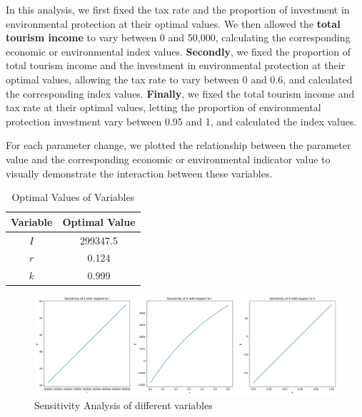 \documentclass[UTF8]{mcmthesis}
\begin{document}
            In this analysis, we first fixed the tax rate and the {proportion of investment in environmental protection} at their optimal values. We then allowed the \textbf{total tourism income} to vary between 0 and 50,000, calculating the corresponding economic or environmental index values. \textbf{Secondly}, we fixed the {proportion of total tourism income} and the investment in environmental protection at their optimal values, allowing the {tax rate} to vary between 0 and 0.6, and calculated the corresponding index values. \textbf{Finally}, we fixed the {total tourism income} and {tax rate} at their optimal values, letting the {proportion of environmental protection investment} vary between 0.95 and 1, and calculated the index values.
            
            For each parameter change, we plotted the relationship between the parameter value and the corresponding economic or environmental indicator value to visually demonstrate the interaction between these variables.
            


            \begin{table}[htbp]
                \centering
                \caption{Optimal Values of Variables}
                \begin{tabular}{cc}
                    \toprule
                    \textbf{Variable} & \textbf{Optimal Value} \\ 
                    \midrule
                    \( I \) & 299347.5 \\ 
                    \( r \) & 0.124 \\ 
                    \( k \) & 0.999 \\ 
                    \bottomrule
                \end{tabular}
                \label{tab:optimal_values}
            \end{table}

            \begin{figure}[htbp]
                \centering

                \includegraphics[width=16cm]{threelines.png}
                \caption{Sensitivity Analysis of different variables}
            \end{figure}
            
\end{document}
